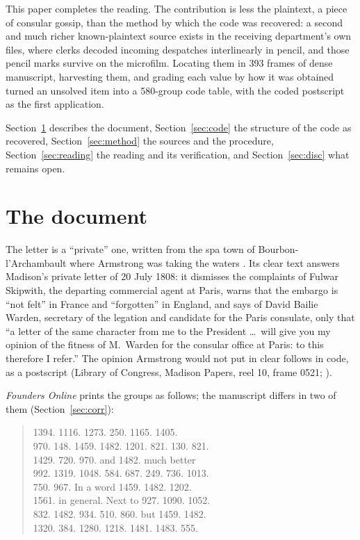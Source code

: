 \documentclass[11pt]{article}
\newcommand{\grp}[1]{\textsf{#1}}
\begin{document}
This paper completes the reading. The contribution is less the plaintext, a piece of consular gossip, than the method by which the code was recovered: a second and much richer known-plaintext source exists in the receiving department's own files, where clerks decoded incoming despatches interlinearly in pencil, and those pencil marks survive on the microfilm. Locating them in 393 frames of dense manuscript, harvesting them, and grading each value by how it was obtained turned an unsolved item into a 580-group code table, with the coded postscript as the first application.

Section~\ref{sec:doc} describes the document, Section~\ref{sec:code} the structure of the code as recovered, Section~\ref{sec:method} the sources and the procedure, Section~\ref{sec:reading} the reading and its verification, and Section~\ref{sec:disc} what remains open.

\section{The document}\label{sec:doc}

The letter is a ``private'' one, written from the spa town of Bourbon-l'Archambault where Armstrong was taking the waters \cite{Skeen:1981}. Its clear text answers Madison's private letter of 20 July 1808: it dismisses the complaints of Fulwar Skipwith, the departing commercial agent at Paris, warns that the embargo is ``not felt'' in France and ``forgotten'' in England, and says of David Bailie Warden, secretary of the legation and candidate for the Paris consulate, only that ``a letter of the same character from me to the President \ldots\ will give you my opinion of the fitness of M.~Warden for the consular office at Paris: to this therefore I refer.'' The opinion Armstrong would not put in clear follows in code, as a postscript (Library of Congress, Madison Papers, reel 10, frame 0521; \cite{LOC:madison}).

\emph{Founders Online} \cite{Founders:3466} prints the groups as follows; the manuscript differs in two of them (Section~\ref{sec:corr}):

\begin{quote}\small\grp{
1394. 1116. 1273. 250. 1165. 1405. \\
970. 148. 1459. 1482. 1201. 821. 130. 821. \\
1429. 720. 970. and 1482. much better \\
992. 1319. 1048. 584. 687. 249. 736. 1013. \\
750. 967. In a word 1459. 1482. 1202. \\
1561. in general. Next to 927. 1090. 1052. \\
832. 1482. 934. 510. 860. but 1459. 1482. \\
1320. 384. 1280. 1218. 1481. 1483. 555.}
\end{quote}
\end{document}
